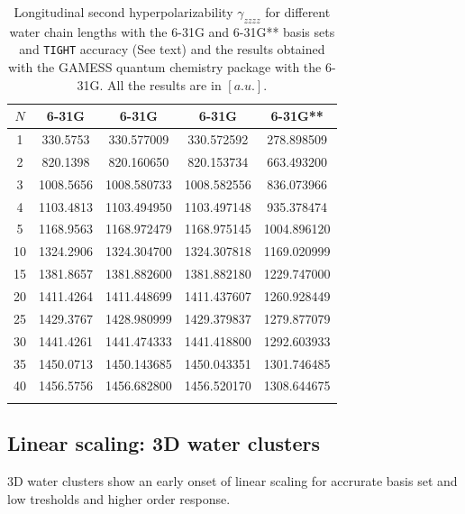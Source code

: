 \documentclass[prl,aps,twocolumn,showpacs,twocolumngrid,superbib]{revtex4}
\begin{document}
\begin{table}
  \centering
  \caption{\protect
    Longitudinal second hyperpolarizability $\gamma_{zzzz}$
    for different water chain lengths with the 6-31G and 6-31G** basis sets
    and {\tt TIGHT} accuracy (See text) and the results obtained with
    the GAMESS quantum chemistry package \cite{gamess} with the 6-31G. 
    All the results are in $[a.u.]$.
  }\label{tab:Gamma_1D_Values}
  \begin{tabular}{ccccc}
    \toprule
    $N$ &\multicolumn{1}{c}{6-31G\footnotemark[1]}
    &\multicolumn{1}{c}{6-31G\footnotemark[2]}
    &\multicolumn{1}{c}{6-31G\footnotemark[2]\footnotemark[3]}
    &\multicolumn{1}{c}{6-31G**\footnotemark[2]}\\
    \hline
    1 &  330.5753 &  330.577009 &  330.572592 &  278.898509 \\
    2 &  820.1398 &  820.160650 &  820.153734 &  663.493200 \\
    3 & 1008.5656 & 1008.580733 & 1008.582556 &  836.073966 \\
    4 & 1103.4813 & 1103.494950 & 1103.497148 &  935.378474 \\
    5 & 1168.9563 & 1168.972479 & 1168.975145 & 1004.896120 \\
    10 & 1324.2906 & 1324.304700 & 1324.307818 & 1169.020999 \\
    15 & 1381.8657 & 1381.882600 & 1381.882180 & 1229.747000 \\
    20 & 1411.4264 & 1411.448699 & 1411.437607 & 1260.928449 \\
    25 & 1429.3767 & 1428.980999 & 1429.379837 & 1279.877079 \\
    30 & 1441.4261 & 1441.474333 & 1441.418800 & 1292.603933 \\
    35 & 1450.0713 & 1450.143685 & 1450.043351 & 1301.746485 \\
    40 & 1456.5756 & 1456.682800 & 1456.520170 & 1308.644675 \\
    \botrule
  \end{tabular}
\end{table}


\subsection{Linear scaling: 3D water clusters}
3D water clusters show an early onset of linear scaling for accrurate
basis set and low tresholds and higher order response.
\end{document}
